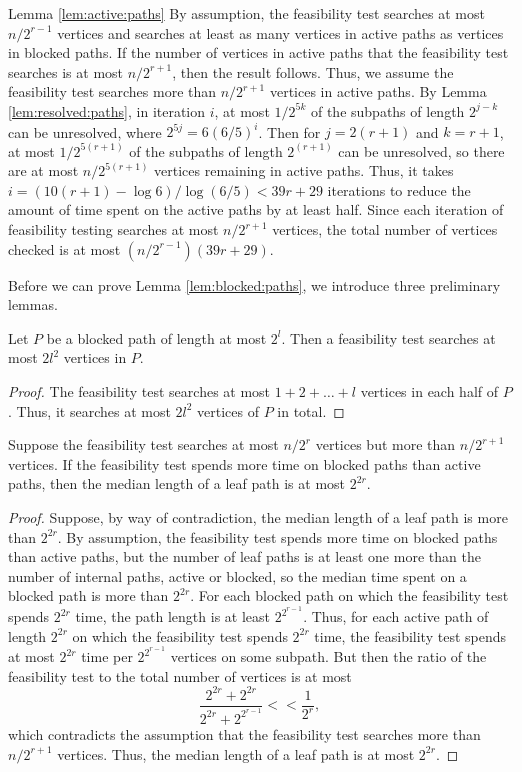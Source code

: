 \documentclass[12pt]{article}
\begin{document}
\begin{spacing}{3}
\begin{proofof}{Lemma \ref{lem:active:paths}}
By assumption, the feasibility test searches at most $n/2^{r-1}$ vertices and searches at least as many vertices in active paths as vertices in blocked paths. If the number of vertices in active paths that the feasibility test searches is at most $n/2^{r+1}$, then the result follows. Thus, we assume the feasibility test searches more than $n/2^{r+1}$ vertices in active paths. By Lemma \ref{lem:resolved:paths}, in iteration $i$, at most $1/2^{5k}$ of the subpaths of length $2^{j-k}$ can be unresolved, where $2^{5j}=6(6/5)^i$. Then for $j=2(r+1)$ and $k=r+1$, at most $1/2^{5(r+1)}$ of the subpaths of length $2^{(r+1)}$ can be unresolved, so there are at most $n/2^{5(r+1)}$ vertices remaining in active paths. Thus, it takes $i=(10(r+1)-\log 6)/\log(6/5)<39r+29$ iterations to reduce the amount of time spent on the active paths by at least half. Since each iteration of feasibility testing searches at most $n/2^{r+1}$ vertices, the total number of vertices checked is at most $\left(n/2^{r-1}\right)(39r+29)$.
\end{proofof}

\noindent
Before we can prove Lemma \ref{lem:blocked:paths}, we introduce three preliminary lemmas. 

\begin{lemma}
\label{lem:blocked:time}
Let $P$ be a blocked path of length at most $2^l$. Then a feasibility test searches at most $2l^2$ vertices in $P$.
\end{lemma}
\begin{proof}
The feasibility test searches at most $1+2+\ldots+l$ vertices in each half of $P$. Thus, it searches at most $2l^2$ vertices of $P$ in total.
\end{proof}

\begin{lemma}
\label{lem:median:leaf}
Suppose the feasibility test searches at most $n/2^r$ vertices but more than $n/2^{r+1}$ vertices. If the feasibility test spends more time on blocked paths than active paths, then the median length of a leaf path is at most $2^{2r}$.
\end{lemma}
\begin{proof}
Suppose, by way of contradiction, the median length of a leaf path is more than $2^{2r}$. By assumption, the feasibility test spends more time on blocked paths than active paths, but the number of leaf paths is at least one more than the number of internal paths, active or blocked, so the median time spent on a blocked path is more than $2^{2r}$. For each blocked path on which the feasibility test spends $2^{2r}$ time, the path length is at least $2^{2^{r-1}}$. Thus, for each active path of length $2^{2r}$ on which the feasibility test spends $2^{2r}$ time, the feasibility test spends at most $2^{2r}$ time per $2^{2^{r-1}}$ vertices on some subpath. But then the ratio of the feasibility test to the total number of vertices is at most
\[\frac{2^{2r}+2^{2r}}{2^{2r}+2^{2^{r-1}}}<<\frac{1}{2^r},\]
which contradicts the assumption that the feasibility test searches more than $n/2^{r+1}$ vertices. Thus, the median length of a leaf path is at most $2^{2r}$.
\end{proof}


\end{spacing}
\end{document}
